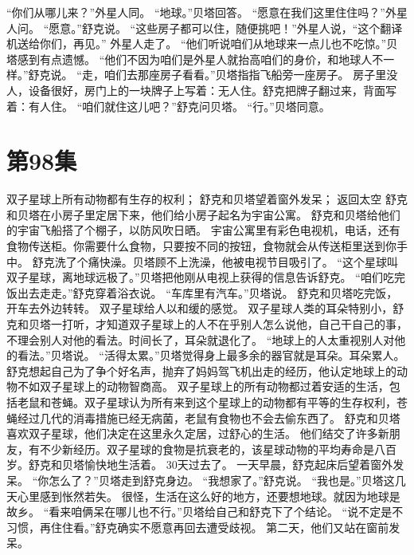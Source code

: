 \documentclass[a4paper,12pt,UTF8,twoside]{ctexbook}
\begin{document}
        “你们从哪儿来？”外星人同。 
        “地球。”贝塔回答。 
        “愿意在我们这里住住吗？”外星人问。 
        “愿意。”舒克说。 
        “这些房子都可以住，随便挑吧！”外星人说，“这个翻译机送给你们，再见。” 
        外星人走了。 
        “他们听说咱们从地球来一点儿也不吃惊。”贝塔感到有点遗憾。 
        “他们不因为咱们是外星人就抬高咱们的身价，和地球人不一样。”舒克说。 
        “走，咱们去那座房子看看。”贝塔指指飞船旁一座房子。 
      房子里没人，设备很好，房门上的一块牌子上写着：无人住。舒克把牌子翻过来，背面写着：有人住。 
        “咱们就住这儿吧？”舒克问贝塔。 
        “行。”贝塔同意。   \chapter{第98集} 
        双子星球上所有动物都有生存的权利； 
        舒克和贝塔望着窗外发呆； 
        返回太空   
        舒克和贝塔在小房子里定居下来，他们给小房子起名为宇宙公寓。 
        舒克和贝塔给他们的宇宙飞船搭了个棚子，以防风吹日晒。 
        宇宙公寓里有彩色电视机，电话，还有食物传送柜。你需要什么食物，只要按不同的按钮，食物就会从传送柜里送到你手中。 
        舒克洗了个痛快澡。贝塔顾不上洗澡，他被电视节目吸引了。 
        “这个星球叫双子星球，离地球远极了。”贝塔把他刚从电视上获得的信息告诉舒克。 
        “咱们吃完饭出去走走。”舒克穿着浴衣说。 
        “车库里有汽车。”贝塔说。 
        舒克和贝塔吃完饭，开车去外边转转。 
        双子星球给人以和缓的感觉。 
        双子星球人类的耳朵特别小，舒克和贝塔一打听，才知道双子星球上的人不在乎别人怎么说他，自己干自己的事，不理会别人对他的看法。时间长了，耳朵就退化了。 
        “地球上的人太重视别人对他的看法。”贝塔说。 
        “活得太累。”贝塔觉得身上最多余的器官就是耳朵。耳朵累人。 
        舒克想起自己为了争个好名声，抛弃了妈妈驾飞机出走的经历，他认定地球上的动物不如双子星球上的动物智商高。 
        双子星球上的所有动物都过着安适的生活，包括老鼠和苍蝇。双子星球认为所有来到这个星球上的动物都有平等的生存权利，苍蝇经过几代的消毒措施已经无病菌，老鼠有食物也不会去偷东西了。 
        舒克和贝塔喜欢双子星球，他们决定在这里永久定居，过舒心的生活。 
        他们结交了许多新朋友，有不少新经历。双子星球的食物是抗衰老的，该星球动物的平均寿命是八百岁。舒克和贝塔愉快地生活着。 
        30天过去了。 
        一天早晨，舒克起床后望着窗外发呆。 
        “你怎么了？”贝塔走到舒克身边。 
        “我想家了。”舒克说。 
        “我也是。”贝塔这几天心里感到怅然若失。 
        很怪，生活在这么好的地方，还要想地球。就因为地球是故乡。 
        “看来咱俩呆在哪儿也不行。”贝塔给自己和舒克下了个结论。 
        “说不定是不习惯，再住住看。”舒克确实不愿意再回去遭受歧视。 
        第二天，他们又站在窗前发呆。 
\end{document}
